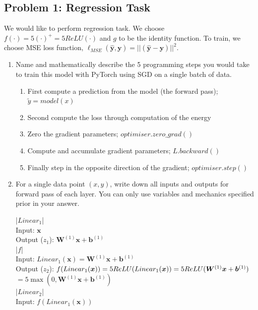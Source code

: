 \documentclass{article}
\begin{document}
\subsection*{Problem 1: Regression Task}
We would like to perform regression task. We choose
$f(\cdot)=5(\cdot)^{+}=5ReLU(\cdot)$ and $g$ to be the identity function. To
train, we choose MSE loss function,
$\ell_{MSE}(\bm{\hat{y}},\bm{y})=||(\bm{\hat{y}}-\bm{y})||^2$.
\begin{enumerate}
  \item Name and mathematically describe the 5 programming steps you
        would take to train this model with PyTorch using SGD on a single batch
        of data.
        \begin{tcolorbox}
          \begin{enumerate}
            \item First compute a prediction from the model (the forward pass); $\tilde{y}=model(x)$
            \item Second compute the loss through computation of the energy
            \item Zero the gradient parameters; $optimiser.zero\_grad()$
            \item Compute and accumulate gradient parameters; $L.backward()$
            \item Finally step in the opposite direction of the gradient; $optimiser.step()$
          \end{enumerate}
        \end{tcolorbox}
  \item For a single data point $(x,y)$, write down all inputs and outputs for
        forward pass of each layer. You can only use variables and mechanics specified
        prior in your answer.
        \begin{tcolorbox}
          |$Linear_1$|\\ Input: $\bm{x}$\\Output ($z_1$): $\bm{W}^{(1)}\bm{x}+\bm{b}^{(1)}$\\
          |$f$|\\ Input: $Linear_1(\bm{x})=\bm{W}^{(1)}\bm{x}+\bm{b}^{(1)}$\\
          Output ($z_2$): $f(Linear_1(\bm{x}))=5ReLU(Linear_1(\bm{x}))\\
            =5ReLU(\bm{W}^{(1)}\bm{x}+\bm{b}^{(1)})$\\
            $=5\max(0,\bm{W}^{(1)}\bm{x}+\bm{b}^{(1)})$\\
          |$Linear_2$|\\ Input: $f(Linear_1(\bm{x}))$\\

\end{tcolorbox}
\end{enumerate}
\end{document}
